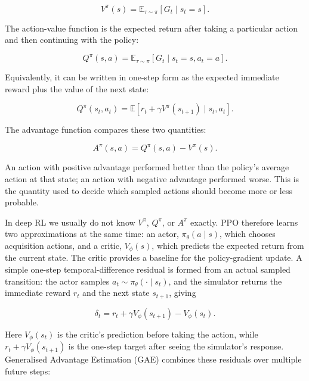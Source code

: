 \begin{equation}
V^\pi(s) = \mathbb{E}_{\tau \sim \pi}[G_t \mid s_t=s].
\end{equation}

The action-value function is the expected return after taking a particular
action and then continuing with the policy:

\begin{equation}
Q^\pi(s,a) =
\mathbb{E}_{\tau \sim \pi}[G_t \mid s_t=s, a_t=a].
\end{equation}

Equivalently, it can be written in one-step form as the expected immediate
reward plus the value of the next state:

\begin{equation}
Q^\pi(s_t,a_t)
=
\mathbb{E}\left[
r_t + \gamma V^\pi(s_{t+1})
\mid s_t, a_t
\right].
\end{equation}

The advantage function compares these two quantities:

\begin{equation}
A^\pi(s,a) = Q^\pi(s,a) - V^\pi(s).
\end{equation}

An action with positive advantage performed better than the policy's average
action at that state; an action with negative advantage performed worse. This
is the quantity used to decide which sampled actions should become more or less
probable.

In deep RL we usually do not know $V^\pi$, $Q^\pi$, or $A^\pi$ exactly. PPO
therefore learns two approximations at the same time: an actor,
$\pi_\theta(a\mid s)$, which chooses acquisition actions, and a critic,
$V_\phi(s)$, which predicts the expected return from the current state. The
critic provides a baseline for the policy-gradient update. A simple one-step
temporal-difference residual is formed from an actual sampled transition: the
actor samples $a_t \sim \pi_\theta(\cdot \mid s_t)$, and the simulator returns
the immediate reward $r_t$ and the next state $s_{t+1}$, giving

\begin{equation}
\delta_t =
r_t + \gamma V_\phi(s_{t+1}) - V_\phi(s_t).
\end{equation}

Here $V_\phi(s_t)$ is the critic's prediction before taking the action, while
$r_t + \gamma V_\phi(s_{t+1})$ is the one-step target after seeing the
simulator's response. Generalised Advantage Estimation (GAE) combines these
residuals over multiple future steps:\cite{schulman_gae_2016}

